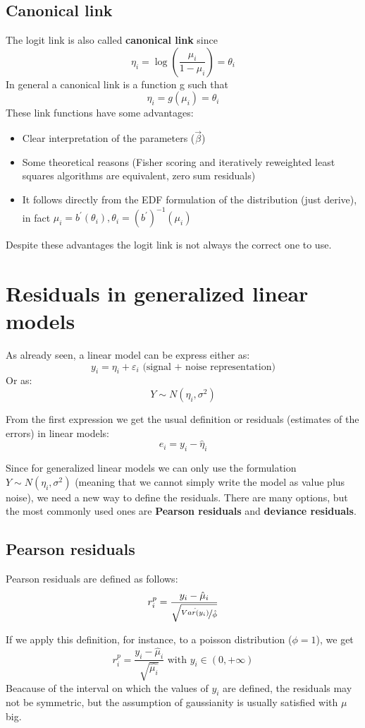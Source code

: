     \subsection{Canonical link}
      The logit link is also called \textbf{canonical link} since 
      $$\eta_i = \log\left(\frac{\mu_i}{1-\mu_i}\right) = \theta_i$$
      In general a canonical link is a function g such that 
      $$\eta_i = g(\mu_i) = \theta_i$$
      These link functions have some advantages:
      \begin{itemize}
        \item Clear interpretation of the parameters ($\vec{\beta}$)
        \item Some theoretical reasons (Fisher scoring and iteratively reweighted least squares algorithms are equivalent, zero sum residuals)
        \item It follows directly from the EDF formulation of the distribution (just derive), in fact $\mu_i = b^\prime(\theta_i), \theta_i = (b^\prime)^{-1}(\mu_i)$
      \end{itemize}
      Despite these advantages the logit link is not always the correct one to use.
  
  \section{Residuals in generalized linear models}
    As already seen, a linear model can be express either as:
    $$y_i = \eta_i + \varepsilon_i \text{ (signal + noise representation)}$$ 
    Or as: 
    $$Y \sim N(\eta_i, \sigma^2)$$

    From the first expression we get the usual definition or residuals (estimates of the errors) in linear models:
    $$e_i = y_i - \hat{\eta}_i$$

    Since for generalized linear models we can only use the formulation $Y \sim N(\eta_i, \sigma^2)$ (meaning that we cannot simply write the model as value plus noise), we need a new way to define the residuals. There are many options, but the most commonly used ones are \textbf{Pearson residuals} and \textbf{deviance residuals}.

    \subsection{Pearson residuals}
      Pearson residuals are defined as follows:
      $$r_i^p = \frac{y_i - \hat{\mu}_i}{\sqrt{\nicefrac{\hat{Var(y_i)}}{\hat{\phi}}}}$$

      If we apply this definition, for instance, to a poisson distribution ($\phi = 1$), we get 
      $$r_i^p = \frac{y_i - \hat{\mu}_i}{\sqrt{\hat{\mu_i}}} \text{ with } y_i \in (0, +\infty)$$ 
      Beacause of the interval on which the values of $y_i$ are defined, the residuals may not be symmetric, but the assumption of gaussianity is usually satisfied with $\mu$ big.

